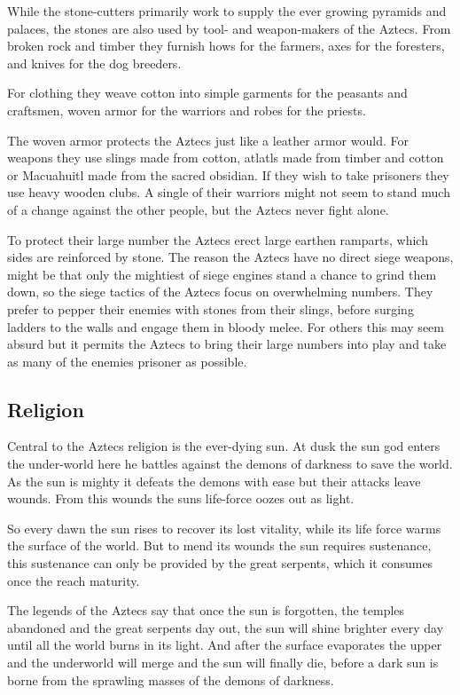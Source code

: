 \documentclass[a4paper]{book}
\begin{document}
While the stone-cutters primarily work to supply the ever growing pyramids and
palaces, the stones are also used by tool- and weapon-makers of the
\gls{Aztecs}. From broken rock and timber they furnish hows for the farmers,
axes for the foresters, and knives for the dog breeders.

For clothing they weave cotton into simple garments for the peasants and
craftsmen, woven armor for the warriors and robes for the priests.

The woven armor protects the \gls{Aztecs} just like a leather armor would. For
weapons they use slings made from cotton, atlatls made from timber and cotton
or Macuahuitl made from the sacred obsidian. If they wish to take prisoners
they use heavy wooden clubs. A single of their warriors might not seem to stand
much of a change against the other people, but the \gls{Aztecs} never fight
alone.

To protect their large number the \gls{Aztecs} erect large earthen ramparts,
which sides are reinforced by stone. The reason the \gls{Aztecs} have no direct
siege weapons, might be that only the mightiest of siege engines stand a chance
to grind them down, so the siege tactics of the \gls{Aztecs} focus on
overwhelming numbers. They prefer to pepper their enemies with stones from
their slings, before surging ladders to the walls and engage them in bloody
melee. For others this may seem absurd but it permits the \gls{Aztecs} to bring
their large numbers into play and take as many of the enemies prisoner as
possible.

\subsection{Religion}
Central to the \gls{Aztecs} religion is the ever-dying sun. At dusk the sun god
enters the under-world here he battles against the demons of darkness to save
the world. As the sun is mighty it defeats the demons with ease but their
attacks leave wounds. From this wounds the suns life-force oozes out as light.

So every dawn the sun rises to recover its lost vitality, while its life force
warms the surface of the world. But to mend its wounds the sun requires
sustenance, this sustenance can only be provided by the great serpents, which
it consumes once the reach maturity.

The legends of the \gls{Aztecs} say that once the sun is forgotten, the temples
abandoned and the great serpents day out, the sun will shine brighter every day
until all the world burns in its light. And after the surface evaporates the
upper and the underworld will merge and the sun will finally die, before a dark
sun is borne from the sprawling masses of the demons of darkness.
\end{document}
